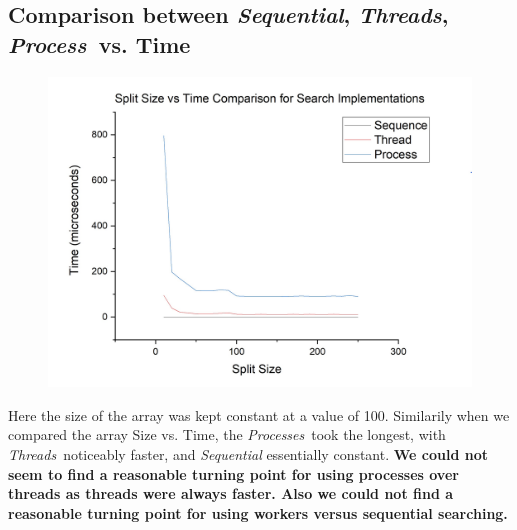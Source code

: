 \documentclass{article}
\begin{document}
            \subsection*{Comparison between \textit{Sequential}, \color{red}\textit{Threads}\color{black}, \color{blue}\textit{Process}\color{black}\ vs. Time}
                \begin{figure}[H]
                    \centering
                    \includegraphics[width=19cm]{nsvt-comparison-n100}
                \end{figure}
                Here the size of the array was kept constant at a value of 100. Similarily when we compared the array Size vs. Time, the \color{blue}\textit{Processes}\color{black}\ took the longest, with \color{red}\textit{Threads}\color{black}\ noticeably faster, and \textit{Sequential} essentially constant.
            \textbf{We could not seem to find a reasonable turning point for using processes over threads as threads were always faster. Also we could not find a reasonable turning point for using workers versus sequential searching.}
\end{document}
